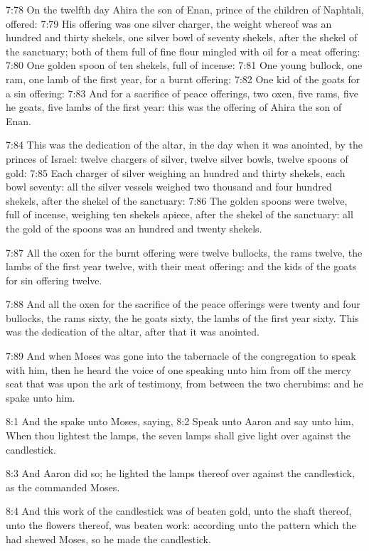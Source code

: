 7:78 On the twelfth day Ahira the son of Enan, prince of the children
of Naphtali, offered: 7:79 His offering was one silver charger, the
weight whereof was an hundred and thirty shekels, one silver bowl of
seventy shekels, after the shekel of the sanctuary; both of them full
of fine flour mingled with oil for a meat offering: 7:80 One golden
spoon of ten shekels, full of incense: 7:81 One young bullock, one
ram, one lamb of the first year, for a burnt offering: 7:82 One kid of
the goats for a sin offering: 7:83 And for a sacrifice of peace
offerings, two oxen, five rams, five he goats, five lambs of the first
year: this was the offering of Ahira the son of Enan.

7:84 This was the dedication of the altar, in the day when it was
anointed, by the princes of Israel: twelve chargers of silver, twelve
silver bowls, twelve spoons of gold: 7:85 Each charger of silver
weighing an hundred and thirty shekels, each bowl seventy: all the
silver vessels weighed two thousand and four hundred shekels, after
the shekel of the sanctuary: 7:86 The golden spoons were twelve, full
of incense, weighing ten shekels apiece, after the shekel of the
sanctuary: all the gold of the spoons was an hundred and twenty
shekels.

7:87 All the oxen for the burnt offering were twelve bullocks, the
rams twelve, the lambs of the first year twelve, with their meat
offering: and the kids of the goats for sin offering twelve.

7:88 And all the oxen for the sacrifice of the peace offerings were
twenty and four bullocks, the rams sixty, the he goats sixty, the
lambs of the first year sixty. This was the dedication of the altar,
after that it was anointed.

7:89 And when Moses was gone into the tabernacle of the congregation
to speak with him, then he heard the voice of one speaking unto him
from off the mercy seat that was upon the ark of testimony, from
between the two cherubims: and he spake unto him.

8:1 And the \LORD spake unto Moses, saying, 8:2 Speak unto Aaron and
say unto him, When thou lightest the lamps, the seven lamps shall give
light over against the candlestick.

8:3 And Aaron did so; he lighted the lamps thereof over against the
candlestick, as the \LORD commanded Moses.

8:4 And this work of the candlestick was of beaten gold, unto the
shaft thereof, unto the flowers thereof, was beaten work: according
unto the pattern which the \LORD had shewed Moses, so he made the
candlestick.

